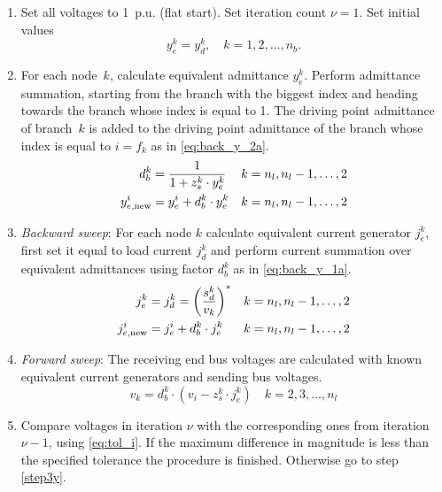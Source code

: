 \documentclass[12pt]{article}
\newcommand{\cc}[1]{{#1}^{\ast}}                        %
\numberwithin{equation}{section}
\numberwithin{table}{section}
\numberwithin{figure}{section}
\begin{document}
\begin{enumerate}
  
  \item Set all voltages to 1~p.u. (flat start). Set iteration count $\nu = 1$. Set initial values
  \begin{equation}
    y_e^k = y_d^k, \quad k = 1, 2, \ldots ,n_b.
  \end{equation}

  \item For each node~$k$, calculate equivalent admittance $y_e^k$. Perform admittance summation, starting from the branch with the biggest index and heading towards the branch whose index is equal to 1. The driving point admittance of branch~$k$ is added to the driving point admittance of the branch whose index is equal to $i = f_k$ as in \eqref{eq:back_y_2a}.
  \begin{align}
  d_b^k &= \frac{1}{1 + z_s^k \cdot y_e^k} & k = n_l, n_l - 1, \ldots ,2
  \label{eq:back_y_1a}
  \\
  y_{e,{\rm new}}^i &= y_e^i + d_b^k \cdot y_e^k & k = n_l, n_l - 1, \ldots ,2
  \label{eq:back_y_2a}
  \end{align}
 
  \item \textit{Backward sweep}: For each node $k$ calculate equivalent current generator $j_e^k$, first set it equal to load current $j_d^k$ and perform current summation over equivalent admittances using factor $d_b^k$ as in \eqref{eq:back_y_1a}.
  \begin{align}
  j_e^k &= j_d^k = \cc{\left(\frac{s_d^k}{v_k}\right)} & k = n_l, n_l - 1, \ldots ,2
  \label{eq:back_y_1}
  \\
  j_{e,{\rm new}}^i &= j_e^i + d_b^k \cdot j_e^k & k = n_l, n_l - 1, \ldots ,2
  \label{eq:back_y_2}
  \end{align}
  \label{step3y}
  
  \item \textit{Forward sweep}: The receiving end bus voltages are calculated with known equivalent current generators and sending bus voltages.
  \begin{equation}
  \label{eq:for_y}
  v_k = d_b^k \cdot (v_i - z_s^k \cdot j_e^k) \quad k = 2, 3, \ldots ,n_l
  \end{equation}
  
  \item Compare voltages in iteration $\nu$ with the corresponding ones from iteration ${\nu - 1}$, using \eqref{eq:tol_i}. If the maximum difference in magnitude is less than the specified tolerance the procedure is finished. Otherwise go to step \ref{step3y}.
  
\end{enumerate}
\end{document}
